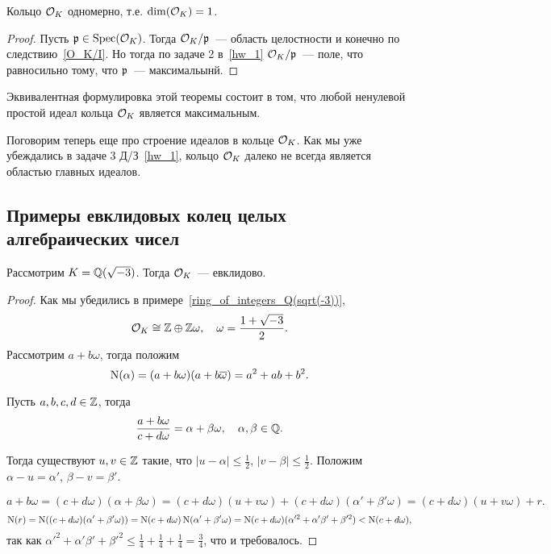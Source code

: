 	\begin{theorem} 
		Кольцо $\mathcal{O}_{K}$ одномерно, т.е. $\dim(\mathcal{O}_{K}) = 1$. 
	\end{theorem}

	\begin{proof}
		Пусть $\mathfrak{p} \in \operatorname{Spec}(\mathcal{O}_{K})$. Тогда $\mathcal{O}_{K}/\mathfrak{p}$~--- область целостности и конечно по  следствию~\ref{O_K/I}. Но тогда по задаче 2 в~\ref{hw_1} $\mathcal{O}_{K}/\mathfrak{p}$~--- поле, что равносильно тому, что $\mathfrak{p}$~--- максимальынй. 
	\end{proof}

	\begin{remark}
		Эквивалентная формулировка этой теоремы состоит в том, что любой ненулевой простой идеал  кольца $\mathcal{O}_{K}$ является максимальным. 
	\end{remark}

	Поговорим теперь еще про строение идеалов в кольце $\mathcal{O}_{K}$. Как мы уже убеждались в задаче 3 Д/З~\ref{hw_1}, кольцо $\mathcal{O}_{K}$ далеко не всегда является областью главных идеалов. 

	\subsection{Примеры евклидовых колец целых алгебраических чисел}

	\begin{statement} 
		Рассмотрим $K = \mathbb{Q}(\sqrt{-3})$. Тогда $\mathcal{O}_{K}$~--- евклидово. 
	\end{statement}

	\begin{proof}
		Как мы убедились в примере~\ref{ring_of_integers_Q(sqrt(-3))}, 
		\[
			\mathcal{O}_{K} \cong \mathbb{Z} \oplus \mathbb{Z} \omega, \quad \omega = \frac{1 + \sqrt{-3}}{2}. 
		\]
		Рассмотрим $a + b \omega$, тогда  положим
		\[
			\operatorname{\mathrm{N}}(\alpha) = (a + b\omega)(a + b\overline{\omega}) = a^2 + ab + b^2.
		\]

		Пусть $a, b, c, d \in \mathbb{Z}$, тогда
		\[
			\frac{a + b\omega}{c + d\omega} = \alpha + \beta \omega, \quad \alpha, \beta \in \mathbb{Q}.
		\]

		Тогда существуют $u, v \in \mathbb{Z}$ такие, что $|u - \alpha| \le \frac{1}{2}$, $|v - \beta| \le \frac{1}{2}$. Положим $\alpha - u = \alpha'$, $\beta - v = \beta'$.

		\[
			a + b\omega = (c + d\omega)(\alpha + \beta \omega) = (c + d\omega)(u + v\omega) + (c + d\omega)(\alpha' + \beta' \omega) = (c + d \omega)(u + v \omega)  + r.
		\]
		\[
			\operatorname{\mathrm{N}}(r) = \operatorname{\mathrm{N}}((c + d\omega)(\alpha' + \beta' \omega)) = \operatorname{\mathrm{N}}(c + d \omega)\operatorname{\mathrm{N}}(\alpha' + \beta' \omega) = \operatorname{\mathrm{N}}(c + d\omega)(\alpha'^2 + \alpha'\beta' + \beta'^2) < \operatorname{\mathrm{N}}(c + d \omega),
		\]
		так как $\alpha'^2 + \alpha'\beta' + \beta'^2 \le \frac{1}{4} + \frac{1}{4} + \frac{1}{4} = \frac{3}{4}$, что и требовалось. 
			
	\end{proof}

